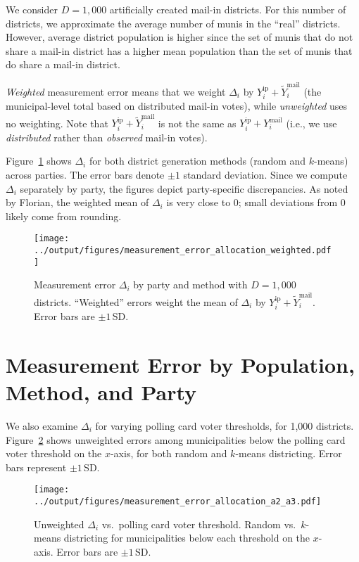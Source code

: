 \documentclass[12pt]{article}
\newcommand{\ip}{\text{ip}}
\newcommand{\mail}{\text{mail}}
\begin{document}
We consider $D=1{,}000$ artificially created mail-in districts. For this number of districts, we approximate the average number of munis in the ``real'' districts. However, average district population is higher since the set of munis that do not share a mail-in district has a higher mean population than the set of munis that do share a mail-in district.

\emph{Weighted} measurement error means that we weight $\Delta_i$ by $Y_i^{\ip} + \widetilde{Y}_i^{\mail}$ (the municipal-level total based on distributed mail-in votes), while \emph{unweighted} uses no weighting. Note that $Y_i^{\ip} + \widetilde{Y}_i^{\mail}$ is not the same as $Y_i^{\ip} + Y_i^{\mail}$ (i.e., we use \emph{distributed} rather than \emph{observed} mail-in votes).

Figure~\ref{fig:measurement_error_allocation_weighted} shows $\Delta_i$ for both district generation methods (random and $k$-means) across parties. The error bars denote $\pm 1$ standard deviation. Since we compute $\Delta_i$ separately by party, the figures depict party-specific discrepancies. As noted by Florian, the weighted mean of $\Delta_i$ is very close to $0$; small deviations from $0$ likely come from rounding. 

\begin{figure}[!h]
\centering
\texttt{[image: ../output/figures/measurement\_error\_allocation\_weighted.pdf]}
\caption{Measurement error $\Delta_i$ by party and method with $D=1{,}000$ districts. ``Weighted'' errors weight the mean of $\Delta_i$ by $Y_i^{\ip} + \widetilde{Y}_i^{\mail}$. Error bars are $\pm 1$\,SD.}
\label{fig:measurement_error_allocation_weighted}
\end{figure}

\section{Measurement Error by Population, Method, and Party}

We also examine $\Delta_i$ for varying polling card voter thresholds, for 1,000 districts. Figure~\ref{fig:measurement_error_allocation_a2_a3} shows unweighted errors among municipalities below the polling card voter threshold on the $x$-axis, for both random and $k$-means districting. Error bars represent $\pm 1$\,SD.

\begin{figure}[!h]
\centering
\texttt{[image: ../output/figures/measurement\_error\_allocation\_a2\_a3.pdf]}
\caption{Unweighted $\Delta_i$ vs.\ polling card voter threshold. Random vs.\ $k$-means districting for municipalities below each threshold on the $x$-axis. Error bars are $\pm 1$\,SD.}
\label{fig:measurement_error_allocation_a2_a3}
\end{figure}
\end{document}
